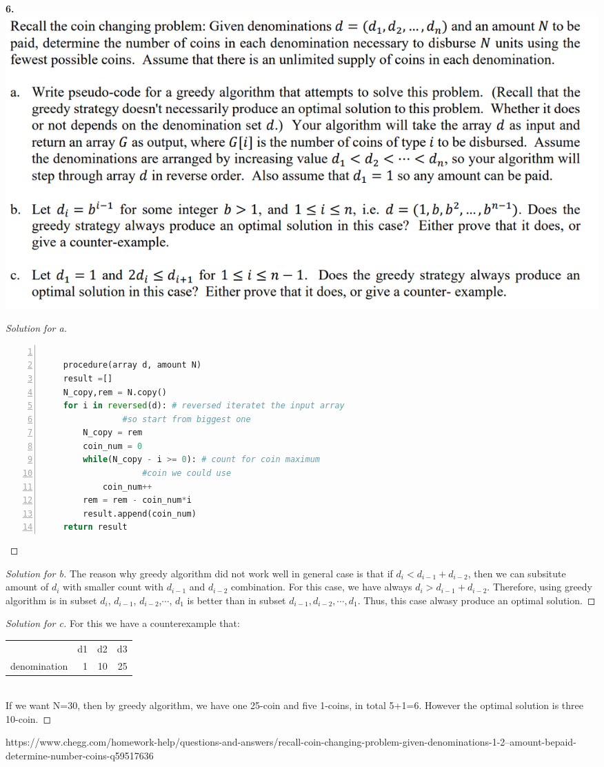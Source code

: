 \documentclass[12pt]{article}
\begin{document}
\textbf{6.}\\
\includegraphics[scale=0.35]{6.png}\\
\begin{proof}[Solution for a]
	\begin{lstlisting}[language={python},numbers=left,numberstyle=\tiny,%frame=shadowbox,  
		rulesepcolor=\color{red!20!green!20!blue!20},  
		keywordstyle=\color{blue!70!black},  
		commentstyle=\color{blue!90!},  
		basicstyle=\ttfamily]  
		
	procedure(array d, amount N)
	result =[]
	N_copy,rem = N.copy() 
	for i in reversed(d): # reversed iteratet the input array 
				#so start from biggest one
		N_copy = rem
		coin_num = 0
		while(N_copy - i >= 0): # count for coin maximum 
					#coin we could use
			coin_num++
		rem = rem - coin_num*i
		result.append(coin_num)
	return result
	\end{lstlisting}
\end{proof}
\begin{proof}[Solution for b]
	The reason why greedy algorithm did not work well in general case is that if $d_i < d_{i-1} +d_{i-2}$, then we can subsitute amount of $d_i$ with smaller count with $d_{i-1}$ and $d_{i-2}$ combination. For this case, we have always $d_i > d_{i-1} +d_{i-2}$. Therefore, using greedy algorithm is in subset $d_i$, $d_{i-1}$, $d_{i-2}$,$\cdots$, $d_1$ is better than in subset $d_{i-1}, d_{i-2},\cdots, d_1$. Thus, this case alwasy produce an optimal solution.
\end{proof}
\begin{proof}[Solution for c]
	For this we have a counterexample that:\\
	\begin{tabular}{lrrr}
		& \multicolumn{1}{l}{d1} & \multicolumn{1}{l}{d2} & \multicolumn{1}{l}{d3} \\
		denomination & 1     & 10    & 25 \\
	\end{tabular}\\
	If we want N=30, then by greedy algorithm, we have one 25-coin and five 1-coins, in total 5+1=6.
	However the optimal solution is three 10-coin.
\end{proof}
\bigskip




\begin{thebibliography}{so}
 https://www.chegg.com/homework-help/questions-and-answers/recall-coin-changing-problem-given-denominations-1-2--amount-bepaid-determine-number-coins-q59517636
\end{thebibliography}
\end{document}

